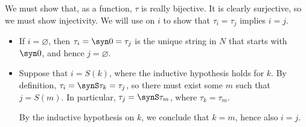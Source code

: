 \begin{defproof}
  We must show that, as a function, \( \tau \) is really bijective. It is clearly surjective, so we must show injectivity. We will use  on \( i \) to show that \( \tau_i = \tau_j \) implies \( i = j \).
  \begin{itemize}
    \item If \( i = \varnothing \), then \( \tau_i = \syn0 = \tau_j \) is the unique string in \( N \) that starts with \( \syn0 \), and hence \( j = \varnothing \).

    \item Suppose that \( i = S(k) \), where the inductive hypothesis holds for \( k \). By definition, \( \tau_i = \synS \tau_k = \tau_j \), so there must exist some \( m \) such that \( j = S(m) \). In particular, \( \tau_j = \synS \tau_m \), where \( \tau_k = \tau_m \).

    By the inductive hypothesis on \( k \), we conclude that \( k = m \), hence also \( i = j \).
  \end{itemize}
\end{defproof}

